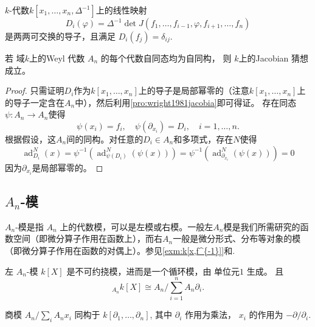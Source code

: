 \begin{lemma}
    $k$-代数$k[x_1,\dots,x_n,\Delta^{-1}]$上的线性映射
    \begin{equation*}
        D_i(\varphi)
        =
        \Delta^{-1}
        \det
        J(f_1,\dots,f_{i-1},\varphi,f_{i+1},\dots,f_n)
    \end{equation*}
    是两两可交换的导子，且满足 $D_i(f_j)=\delta_{ij}$.
\end{lemma}

\begin{theorem}
    若 域$k$上的Weyl 代数 $A_n$ 的每个代数自同态均为自同构，
    则 $k$上的Jacobian 猜想成立。
    \begin{proof}
        只需证明$D_i$作为$k[x_1,\dots,x_n]$上的导子是局部幂零的（注意$k[x_1,\dots,x_n]$上的导子一定含在$A_n$中），然后利用\ref{pro:wright1981jacobia}即可得证。
        存在同态$\psi : A_n \to A_n$使得
        \begin{equation*}
            \psi(x_i)=f_i, \quad \psi(\partial_{x_i})=D_i, \quad i=1,\dots,n.
        \end{equation*}
        根据假设，这$A_n$间的同构。对任意的$D_i\in A_n$和多项式，存在$N$使得
        \begin{equation*}
            \operatorname{ad}_{D_i}^N(x)
            =
            \psi^{-1}\left(\operatorname{ad}_{\psi(D_i)}^N(\psi(x))\right)
            =
            \psi^{-1}\left(\operatorname{ad}_{\partial_{x_i}}^N(\psi(x))\right)
            =
            0
        \end{equation*}
        因为$\partial_{x_i}$是局部幂零的。
    \end{proof}
\end{theorem}



\subsection{$A_n$-模}
$A_n$-模是指 $A_n$ 上的代数模，可以是左模或右模。一般左$A_n$模是我们所需研究的函数空间（即微分算子作用在函数上），而右$A_n$一般是微分形式、分布等对象的模（即微分算子作用在函数的对偶上）。参见\ref{exm:k[x,f^{-1}]}和\cite{bernshtein1972analytic}.
\begin{example}
    \label{exm:k[x]}
    左 $A_n$-模 $k[X]$ 是不可约挠模，进而是一个循环模，由 单位元$1$ 生成。
    且
    \[
        {}_{A_n}k[X]\cong
        A_n/\sum_{i=1}^n A_n\partial_i.
    \]
\end{example}

\begin{proposition}
    商模
    $A_n/\sum_i A_n x_i$
    同构于 $k[\partial_1,\dots,\partial_n]$,
    其中 $\partial_i$ 作用为乘法，
    $x_i$ 的作用为 $-\partial/\partial_i$.
\end{proposition}

